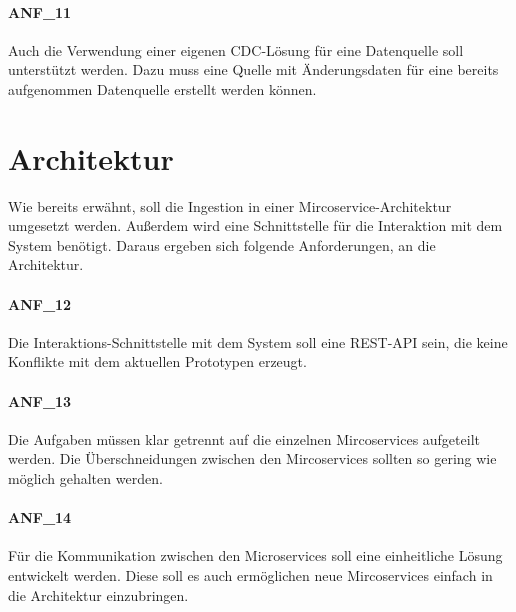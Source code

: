 \paragraph{ANF\_11}
\label{ANF_11}
Auch die Verwendung einer eigenen CDC-Lösung für eine Datenquelle soll unterstützt werden.
Dazu muss eine Quelle mit Änderungsdaten für eine bereits aufgenommen Datenquelle erstellt werden können.


\section{Architektur}
Wie bereits erwähnt, soll die Ingestion in einer Mircoservice-Architektur umgesetzt werden.
Außerdem wird eine Schnittstelle für die Interaktion mit dem System benötigt.
Daraus ergeben sich folgende Anforderungen, an die Architektur.

\paragraph{ANF\_12}
\label{ANF_12}
Die Interaktions-Schnittstelle mit dem System soll eine REST-API sein, die keine Konflikte mit dem aktuellen Prototypen erzeugt.

\paragraph{ANF\_13}
\label{ANF_13}
Die Aufgaben müssen klar getrennt auf die einzelnen Mircoservices aufgeteilt werden.
Die Überschneidungen zwischen den Mircoservices sollten so gering wie möglich gehalten werden.

\paragraph{ANF\_14}
\label{ANF_14}
Für die Kommunikation zwischen den Microservices soll eine einheitliche Lösung entwickelt werden.
Diese soll es auch ermöglichen neue Mircoservices einfach in die Architektur einzubringen.

